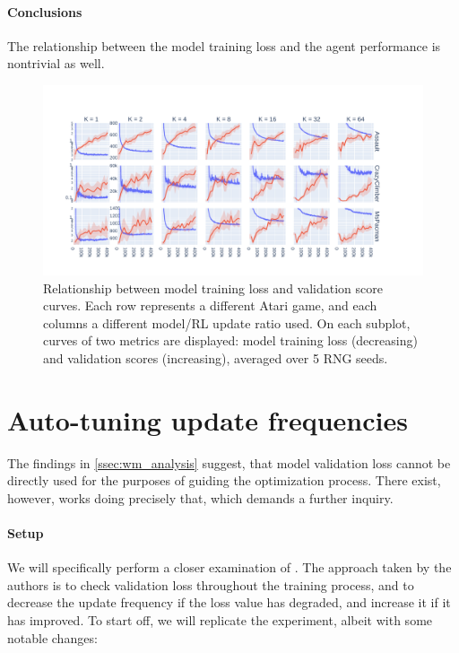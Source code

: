 \documentclass[en]{pracamgr}
\newcommand{\figurewidth}{\linewidth}
\newcommand{\figureheight}{0.8\paperheight}
\begin{document}
\paragraph{Conclusions} The relationship between the model training loss and the agent performance is nontrivial as well.

\begin{figure}
  \centering
  \includegraphics[width=\figurewidth,height=\figureheight,keepaspectratio]{assets/train_loss_v_perf.pdf}
  \caption{Relationship between model training loss and validation score curves. Each row represents a different Atari game, and each columns a different model/RL update ratio used. On each subplot, curves of two metrics are displayed: model training loss (decreasing) and validation scores (increasing), averaged over 5 RNG seeds.}
  \label{fig:train_v_perf}
\end{figure}

\section{Auto-tuning update frequencies}

The findings in \autoref{ssec:wm_analysis} suggest, that model validation loss cannot be directly used for the purposes of guiding the optimization process. There exist, however, works doing precisely that, which demands a further inquiry.

\paragraph{Setup} We will specifically perform a closer examination of \autocite{dorkaDynamicUpdatetoDataRatio2023}. The approach taken by the authors is to check validation loss throughout the training process, and to decrease the update frequency if the loss value has degraded, and increase it if it has improved. To start off, we will replicate the experiment, albeit with some notable changes:
\end{document}
